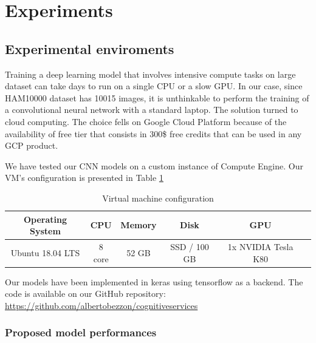 \section{Experiments} \label{experiments}

	\subsection{Experimental enviroments}
	
		Training a deep learning model that involves intensive compute tasks on large dataset can take days to run on a single CPU or a slow GPU. In our case, since HAM10000 dataset has 10015 images, it is unthinkable to perform the training of a convolutional neural network with a standard laptop. The solution turned to cloud computing. The choice fells on Google Cloud Platform because of the availability of free tier that consists in 300\$ free credits that can be used in any GCP product. 
		
		\smallskip
		
		We have tested our CNN models on a custom instance of Compute Engine. Our VM’s configuration is presented in Table \ref{tab:hw-config}
		
		\begin{table}[H]
			\centering
			\begin{tabular}{ |c|c|c|c|c|c| }
				\hline
				\textbf{Operating System} & \textbf{CPU} & \textbf{Memory} & \textbf{Disk} & \textbf{GPU} \\ \hline
				
				Ubuntu 18.04 LTS & 8 core & 52 GB & SSD / 100 GB & 1x NVIDIA Tesla K80 \\ \hline
				
			\end{tabular}
			\caption{Virtual machine configuration}
			\label{tab:hw-config}
		\end{table}
	
		Our models have been implemented in keras using tensorflow as a backend. The code is available on our GitHub repository: \url{https://github.com/albertobezzon/cognitiveservices}
		
	\subsubsection{Proposed model performances}
	
